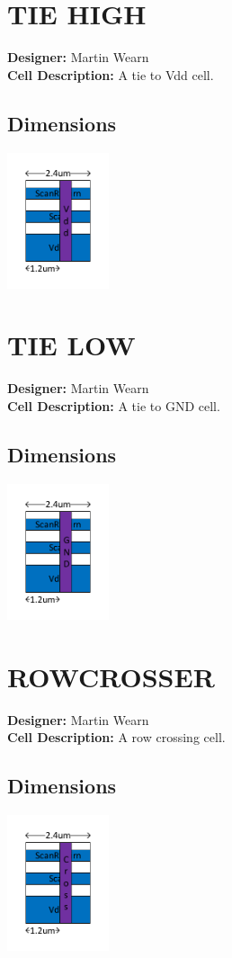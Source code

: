 \newpage

\begin{multicols}{2}
\section{TIE HIGH}
\makebox[\linewidth]{\rule{0.5\textwidth}{0.4pt}}
{\bf Designer: } Martin Wearn\\
{\bf Cell Description: } A tie to Vdd cell.\\
\subsection*{Dimensions}\includegraphics[width=\textwidth,height=4cm,keepaspectratio=true]{../tiehigh/blackbox.pdf}

\section{TIE LOW}
\makebox[\linewidth]{\rule{0.5\textwidth}{0.4pt}} 
{\bf Designer: } Martin Wearn\\
{\bf Cell Description: } A  tie to GND cell.\\
\subsection*{Dimensions}\includegraphics[width=\textwidth,height=4cm,keepaspectratio=true]{../tielow/blackbox.pdf}
\end{multicols}

\section{ROWCROSSER} \makebox[\linewidth]{\rule{\textwidth}{0.4pt}}
{\bf Designer: } Martin Wearn\\
{\bf Cell Description: } A row crossing cell.\\
\subsection*{Dimensions}\includegraphics[width=\textwidth,height=4cm,keepaspectratio=true]{../rowcrosser/blackbox.pdf}



